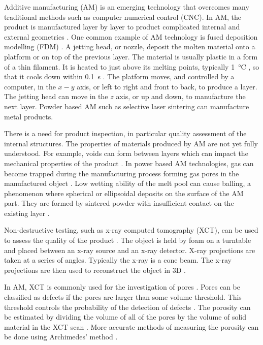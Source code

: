 \documentclass{article}
\begin{document}
Additive manufacturing (AM) is an emerging technology that overcomes many traditional methods such as computer numerical control (CNC). In AM, the product is manufactured layer by layer to product complicated internal and external geometries \citep{ngo2018additive, wong2012review}. One common example of AM technology is fused deposition modelling (FDM) \citep{crump1991fused, crump1992apparatus, stratasys2019what}. A jetting head, or nozzle, deposit the molten material onto a platform or on top of the previous layer. The material is usually plastic in a form of a thin filament. It is heated to just above its melting points, typically \SI{1}{\degreeCelsius} \citep{crump1992apparatus}, so that it cools down within \SI{0.1}{\second} \citep{kruth1991material}. The platform moves, and controlled by a computer, in the $x-y$ axis, or left to right and front to back, to produce a layer. The jetting head can move in the $z$ axis, or up and down, to manufacture the next layer. Powder based AM such as selective laser sintering \citep{3d2019our, deckard1989method, dtm1990the} can manufacture metal products.

There is a need for product inspection, in particular quality assessment of the internal structures. The properties of materials produced by AM are not yet fully understood. For example, voids can form between layers which can impact the mechanical properties of the product \citep{ngo2018additive, wang20173d}. In power based AM technologies, gas can become trapped during the manufacturing process forming gas pores in the manufactured object \citep{tammas2015xct, thijs2010study}. Low wetting ability of the melt pool can cause balling, a phenomenon where spherical or ellipsoidal deposits on the surface of the AM part. They are formed by sintered powder with insufficient contact on the existing layer \citep{gu2009balling, li2012balling}.

Non-destructive testing, such as x-ray computed tomography (XCT), can be used to assess the quality of the product \citep{kruth2011computed, sun2012overview}. The object is held by foam on a turntable and placed between an x-ray source and an x-ray detector. X-ray projections are taken at a series of angles. Typically the x-ray is a cone beam. The x-ray projections are then used to reconstruct the object in 3D \citep{brooks1976principles, feldkamp1984practical, smith1990cone}. 

In AM, XCT is commonly used for the investigation of pores \citep{thompson2016x}. Pores can be classified as defects if the pores are larger than some volume threshold. This threshold controls the probability of the detection of defects \citep{amrhein2014characterization, gandossi2010probability}. The porosity can be estimated by dividing the volume of all of the pores by the volume of solid material in the XCT scan \citep{taud2005porosity}. More accurate methods of measuring the porosity can be done using Archimedes' method \citep{spierings2011comparison}.
\end{document}
